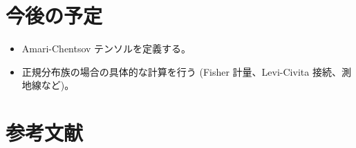\documentclass[report]{jlreq}
\begin{document}
%
\section*{今後の予定}

\begin{itemize}
    \item Amari-Chentsov テンソルを定義する。
    \item 正規分布族の場合の具体的な計算を行う
        (Fisher 計量、Levi-Civita 接続、測地線など)。
\end{itemize}

%
\section*{参考文献}

\nocite{amari_information_2016}
\nocite{bn1970_pdf}

{
    \renewcommand{\bibsection}{}
    
    
}
\end{document}
